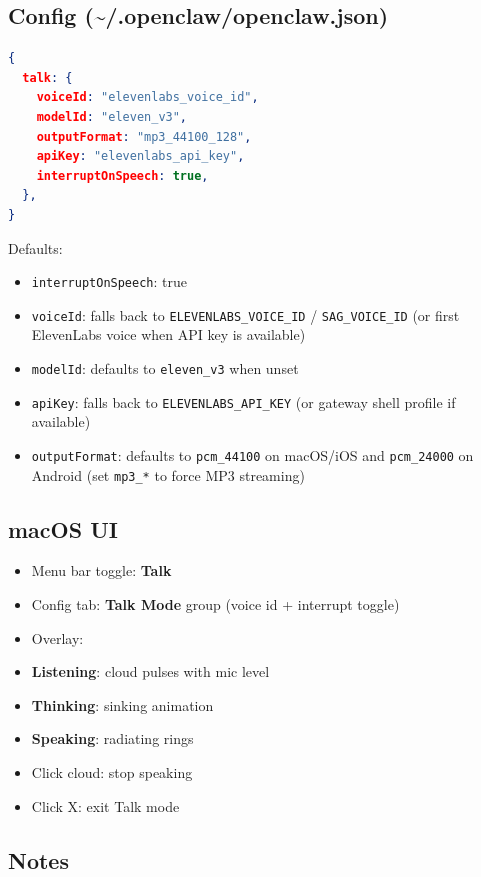 \subsection{Config (\textasciitilde{}/.openclaw/openclaw.json)}


\begin{lstlisting}[language=json]
{
  talk: {
    voiceId: "elevenlabs_voice_id",
    modelId: "eleven_v3",
    outputFormat: "mp3_44100_128",
    apiKey: "elevenlabs_api_key",
    interruptOnSpeech: true,
  },
}
\end{lstlisting}


Defaults:

\begin{itemize}
  \item \texttt{interruptOnSpeech}: true
  \item \texttt{voiceId}: falls back to \texttt{ELEVENLABS\_VOICE\_ID} / \texttt{SAG\_VOICE\_ID} (or first ElevenLabs voice when API key is available)
  \item \texttt{modelId}: defaults to \texttt{eleven\_v3} when unset
  \item \texttt{apiKey}: falls back to \texttt{ELEVENLABS\_API\_KEY} (or gateway shell profile if available)
  \item \texttt{outputFormat}: defaults to \texttt{pcm\_44100} on macOS/iOS and \texttt{pcm\_24000} on Android (set \texttt{mp3\_*} to force MP3 streaming)
\end{itemize}


\subsection{macOS UI}


\begin{itemize}
  \item Menu bar toggle: \textbf{Talk}
  \item Config tab: \textbf{Talk Mode} group (voice id + interrupt toggle)
  \item Overlay:
  \item \textbf{Listening}: cloud pulses with mic level
  \item \textbf{Thinking}: sinking animation
  \item \textbf{Speaking}: radiating rings
  \item Click cloud: stop speaking
  \item Click X: exit Talk mode
\end{itemize}


\subsection{Notes}


